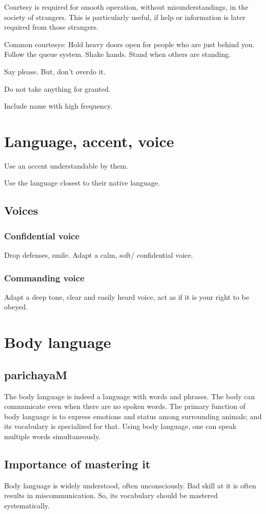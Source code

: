 \documentclass[oneside, article]{memoir}
\begin{document}
Courtesy is required for smooth operation, without misunderstandings, in the society of strangers. This is particularly useful, if help or information is later required from those strangers.

Common courtesys: Hold heavy doors open for people who are just behind you. Follow the queue system. Shake hands. Stand when others are standing.

Say please. But, don't overdo it.

Do not take anything for granted.

Include name with high frequency.

\chapter{Language, accent, voice}
Use an accent understandable by them.

Use the language closest to their native language.

\section{Voices}
\subsection{Confidential voice}
Drop defenses, smile. Adapt a calm, soft/ confidential voice.

\subsection{Commanding voice}
Adapt a deep tone, clear and easily heard voice, act as if it is your right to be obeyed.


\chapter{Body language}
\section{parichayaM}
The body language is indeed a language with words and phrases. The body can communicate even when there are no spoken words. The primary function of body language is to express emotions and status among surrounding animals; and its vocabulary is specialized for that. Using body language, one can speak multiple words simultaneously.

\section{Importance of mastering it}
Body language is widely understood, often unconsciously. Bad skill at it is often results in miscommunication. So, its vocabulary should be mastered systematically.
\end{document}
